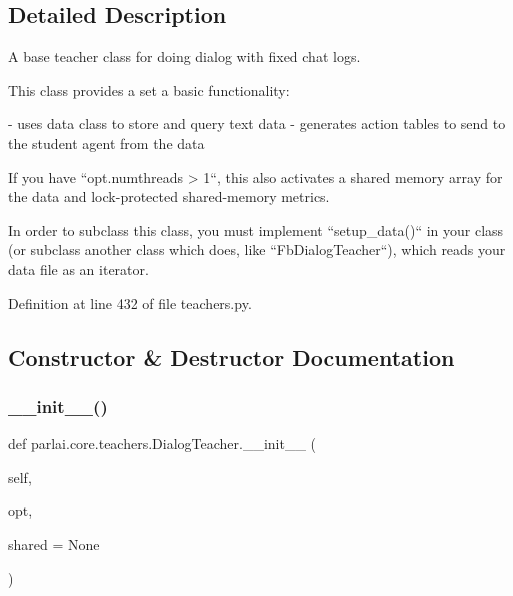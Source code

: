 \subsection{Detailed Description}
\begin{DoxyVerb}A base teacher class for doing dialog with fixed chat logs.

This class provides a set a basic functionality:

- uses data class to store and query text data
- generates action tables to send to the student agent from the data

If you have ``opt.numthreads > 1``, this also activates a shared memory
array for the data and lock-protected shared-memory metrics.

In order to subclass this class, you must implement ``setup_data()`` in
your class (or subclass another class which does, like
``FbDialogTeacher``), which reads your data file as an iterator.
\end{DoxyVerb}
 

Definition at line 432 of file teachers.\+py.



\subsection{Constructor \& Destructor Documentation}
\mbox{\label{classparlai_1_1core_1_1teachers_1_1DialogTeacher_a9385b9ae914ef84be6b54107811b202b}} 
\subsubsection{\texorpdfstring{\+\_\+\+\_\+init\+\_\+\+\_\+()}{\_\_init\_\_()}}
{\footnotesize\ttfamily def parlai.\+core.\+teachers.\+Dialog\+Teacher.\+\_\+\+\_\+init\+\_\+\+\_\+ (\begin{DoxyParamCaption}\item[{}]{self,  }\item[{}]{opt,  }\item[{}]{shared = {\ttfamily None} }\end{DoxyParamCaption})}



